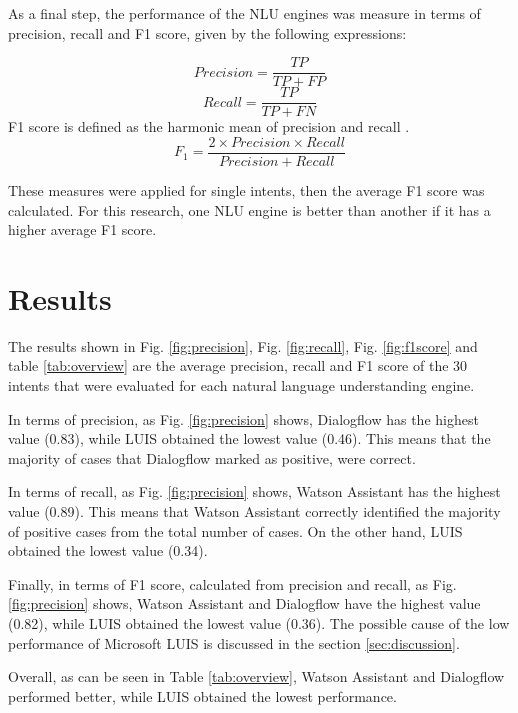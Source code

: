 \documentclass[conference, letterpaper]{IEEEtran}
\begin{document}
As a final step, the performance of the NLU engines was measure in terms of precision, recall and F1 score, given by the following expressions:

\begin{equation}
  Precision=\frac{TP}{TP+FP}\label{eq1}
\end{equation}
\begin{equation}
  Recall=\frac{TP}{TP+FN}\label{eq2}
\end{equation}
F1 score is defined as the harmonic mean of precision and recall \cite{campesato2020artificial}.
\begin{equation}
  F_{1} =\frac{2 \times Precision\times Recall}{Precision+Recall}\label{eq3}
\end{equation}

These measures were applied for single intents, then the average F1 score was calculated. For this research, one NLU engine is better than another if it has a higher average F1 score.

\section{Results}

The results shown in Fig. \ref{fig:precision}, Fig. \ref{fig:recall}, Fig. \ref{fig:f1score} and table \ref{tab:overview} are the average precision, recall and F1 score of the 30 intents that were evaluated for each natural language understanding engine.

In terms of precision, as Fig. \ref{fig:precision} shows, Dialogflow has the highest value (0.83), while LUIS obtained the lowest value (0.46). This means that the majority of cases that Dialogflow marked as positive, were correct.

In terms of recall, as Fig. \ref{fig:precision} shows, Watson Assistant has the highest value (0.89). This means that Watson Assistant correctly identified the majority of positive cases from the total number of cases. On the other hand, LUIS obtained the lowest value (0.34).

Finally, in terms of F1 score, calculated from precision and recall, as Fig. \ref{fig:precision} shows, Watson Assistant and Dialogflow have the highest value (0.82), while LUIS obtained the lowest value (0.36). The possible cause of the low performance of Microsoft LUIS is discussed in the section \ref{sec:discussion}.

Overall, as can be seen in Table \ref{tab:overview}, Watson Assistant and Dialogflow performed better, while LUIS obtained the lowest performance.
\end{document}
